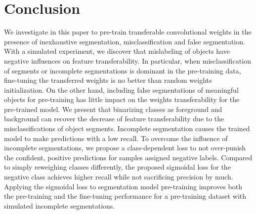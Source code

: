 \section{Conclusion}
\label{sec:conclusion}

We investigate in this paper to pre-train transferable convolutional weights in the presence of inexhaustive segmentation, misclassification and false segmentation.
With a simulated experiment, we discover that mislabeling of objects have negative influences on feature transferability.
In particular, when misclassification of segments or incomplete segmentations is dominant in the pre-training data, fine-tuning the transferred weights is no better than random weights initialization.
On the other hand, including false segmentations of meaningful objects for pre-training has little impact on the weights transferability for the pre-trained model.
We present that binarizing classes as foreground and background can recover the decrease of feature transferability due to the misclassifications of object segments.
Incomplete segmentation causes the trained model to make predictions with a low recall.
To overcome the influence of incomplete segmentations, we propose a class-dependent loss to not over-punish the confident, positive predictions for samples assigned negative labels.
Compared to simply reweighing classes differently, the proposed sigmoidal loss for the negative class achieves higher recall while not sacrificing precision by much.
Applying the sigmoidal loss to segmentation model pre-training improves both the pre-training and the fine-tuning performance for a pre-training dataset with simulated incomplete segmentations.
